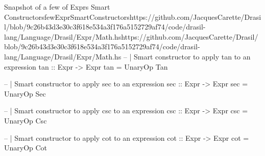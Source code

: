 \begin{haskell}{Snapshot of a few of Exprs Smart Constructors}{fewExprSmartConstructors}{https://github.com/JacquesCarette/Drasil/blob/9c26b43d3e30c3f618e534a3f176a5152729a\linebreak{}f74/code/drasil-lang/Language/Drasil/Expr/Math.hs}{https://github.com/JacquesCarette/Drasil/blob/9c26b43d3e30c3f618e534a3f176a5152729af74/code/drasil-lang/Language/Drasil/Expr/Math.hs}
-- | Smart constructor to apply tan to an expression
tan :: Expr -> Expr
tan = UnaryOp Tan

-- | Smart constructor to apply sec to an expression
sec :: Expr -> Expr 
sec = UnaryOp Sec

-- | Smart constructor to apply csc to an expression
csc :: Expr -> Expr
csc = UnaryOp Csc

-- | Smart constructor to apply cot to an expression
cot :: Expr -> Expr 
cot = UnaryOp Cot
\end{haskell}
